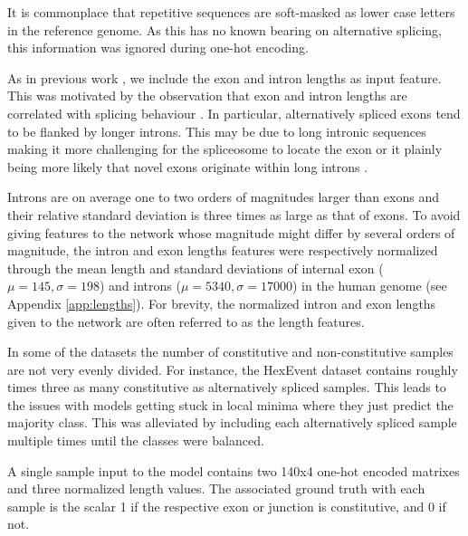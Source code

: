 It is commonplace that repetitive sequences are soft-masked as lower case letters in the reference genome. As this has no known bearing on alternative splicing, this information was ignored during one-hot encoding.

As in previous work \cite{dsc} \cite{flawed4}, we include the exon and intron lengths as input feature. This was motivated by the observation that exon and intron lengths are correlated with splicing behaviour \cite{lengthsref1} \cite{lengthsref2}. In particular, alternatively spliced exons tend to be flanked by longer introns. This may be due to long intronic sequences making it more challenging for the spliceosome to locate the exon or it plainly being more likely that novel exons originate within long introns \cite{bestlengthsref}. 


Introns are on average one to two orders of magnitudes larger than exons and their relative standard deviation is three times as large as that of exons. To avoid giving features to the network whose magnitude might differ by several orders of magnitude, the intron and exon lengths features were respectively normalized through the mean length and standard deviations of internal exon ($\mu=145, \sigma=198$) and introns ($\mu=5340, \sigma=17000$) in the human genome (see Appendix \ref{app:lengths}). For brevity, the normalized intron and exon lengths given to the network are often referred to as the length features.

In some of the datasets the number of constitutive and non-constitutive samples are not very evenly divided. For instance, the HexEvent dataset contains roughly times three as many constitutive as alternatively spliced samples. This leads to the issues with models getting stuck in local minima where they just predict the majority class. This was alleviated by including each alternatively spliced sample multiple times until the classes were balanced.

A single sample input to the model contains two 140x4 one-hot encoded matrixes and three normalized length values. The associated ground truth with each sample is the scalar 1 if the respective exon or junction is constitutive, and 0 if not.
